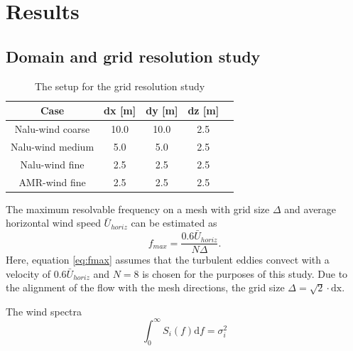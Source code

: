\section{Results}

\subsection{Domain and grid resolution study}

\begin{table}
\caption{\label{tab:GridStudySetup} The setup for the grid resolution study} \centering
\begin{tabular}{ccccc}
  \hline
  Case              & dx [m] & dy [m] & dz [m] \\
  \hline
  Nalu-wind coarse  &  10.0  & 10.0   & 2.5   \\
  Nalu-wind medium  &   5.0  &  5.0   & 2.5   \\
  Nalu-wind fine    &   2.5  &  2.5   & 2.5   \\
  AMR-wind fine     &   2.5  &  2.5   & 2.5   \\
\hline
\end{tabular}
\end{table}

The maximum resolvable frequency on a mesh with grid size $\Delta$ and
average horizontal wind speed $\bar{U}_{horiz}$ can be estimated as
\begin{equation}
  \label{eq:fmax}
  f_{max} = \frac{0.6\bar{U}_{horiz}}{N\Delta}.
\end{equation}
Here, equation \ref{eq:fmax} assumes that the turbulent eddies convect
with a velocity of $0.6\bar{U}_{horiz}$ and $N=8$ is chosen for the
purposes of this study.  Due to the alignment of the flow with the
mesh directions, the grid size $\Delta = \sqrt{2}\cdot \textrm{dx}$.

The wind spectra
\begin{equation}
  \int_0^\infty S_i(f) \textrm{d}f = \sigma_i^2
\end{equation}

